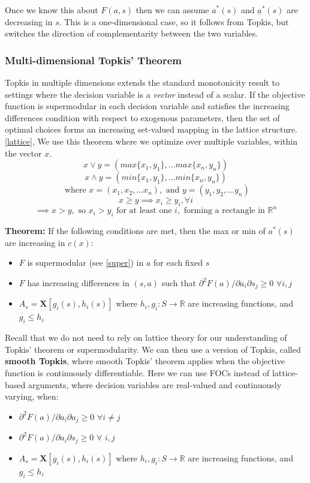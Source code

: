\documentclass{article}
\begin{document}
\noindent Once we know this about $F(a,s)$ then we can assume $\overline{a}^*(s)$ and $\underline{a}^*(s)$ are decreasing in $s$. This is a one-dimensional case, so it follows from Topkis, but switches the direction of complementarity between the two variables. 


\subsubsection{Multi-dimensional Topkis' Theorem}
Topkis in multiple dimensions extends the standard monotonicity result to settings where the decision variable is a \textit{vector} instead of a scalar. If the objective function is supermodular in each decision variable and satisfies the increasing differences condition with respect to exogenous parameters, then the set of optimal choices forms an increasing set-valued mapping in the lattice structure.\ref{lattice}, We use this theorem where we optimize over multiple variables, within the vector $x$. \\
\[
x \vee y = (max\{x_1, y_1\},...max\{x_n, y_n\}) 
\]
\[
x \wedge y = (min\{x_1, y_1\},...min\{x_n, y_n\})
\]
\[
\text{ where } x = (x_1, x_2,...x_n), \text{ and } y = (y_1, y_2,...y_n)
\]
\[
x \geq y \implies x_i \geq y_i, \forall i
\]
\[
\implies x > y, \text{ so } x_i > y_i \text{ for at least one  } i, \text{ forming a rectangle in } \mathbb{R}^n
\]

\par
\par
\noindent \textbf{Theorem:} If the following conditions are met, then the max or min of $a^*(s)$ are increasing in $c(x)$:
\begin{itemize}
    \item $F$ is supermodular (see \ref{super}) in $a$ for each fixed $s$
    \item $F$ has increasing differences in $(s,a)$ such that $\partial^2F(a)/\partial a_i \partial s_j \geq 0$ 
    $\forall i,j$
    \item $A_s = \boldsymbol{X}[g_i(s), h_i(s)]$ where $h_i, g_i: S \rightarrow \mathbb{R}$ are increasing functions, and $g_i \leq h_i$
\end{itemize}
\par
\par
\noindent Recall that we do not need to rely on lattice theory for our understanding of Topkis' theorem or supermodularity. We can then use a version of Topkis, called \textbf{smooth Topkis}, where smooth Topkis’ theorem applies when the objective function is continuously differentiable. Here we can use FOCs instead of lattice-based arguments, where decision variables are real-valued and continuously varying, when:
\begin{itemize}
    \item $\partial^2F(a)/\partial a_i \partial a_j \geq 0$ 
    $\forall i \neq j$
    \item $\partial^2F(a)/\partial a_i \partial s_j \geq 0$ 
    $\forall$  $i, j$
    \item $A_s = \boldsymbol{X}[g_i(s), h_i(s)]$ where $h_i, g_i: S \rightarrow \mathbb{R}$ are increasing functions, and $g_i \leq h_i$
\end{itemize}
\end{document}
